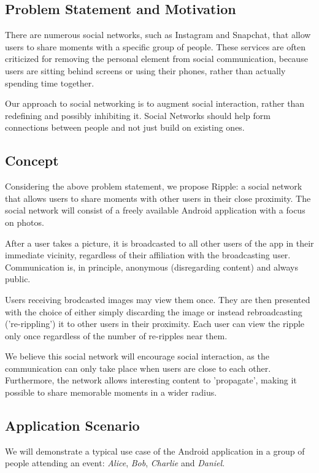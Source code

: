 \documentclass{report}
\begin{document}
\subsection{Problem Statement and Motivation}
There are numerous social networks, such as Instagram and Snapchat, that allow users to share moments with a specific group of people.
These services are often criticized for removing the personal element from social communication, because users are sitting behind screens or using their phones, rather than actually spending time together.

Our approach to social networking is to augment social interaction, rather than redefining and possibly inhibiting it. Social Networks should help form connections between people and not just build on existing ones.

\subsection{Concept}
Considering the above problem statement, we propose Ripple: a social network that allows users to share moments with other users in their close proximity. The social network will consist of a freely available Android application with a focus on photos.

After a user takes a picture, it is broadcasted to all other users of the app in their immediate vicinity, regardless of their affiliation with the broadcasting user. Communication is, in principle, anonymous (disregarding content) and always public.

Users receiving brodcasted images may view them once. They are then presented with the choice of either simply discarding the image or instead rebroadcasting ('re-rippling') it to other users in their proximity.
Each user can view the ripple only once regardless of the number of re-ripples near them.

We believe this social network will encourage social interaction, as the communication can only take place when users are close to each other. Furthermore, the network allows interesting content to 'propagate', making it possible to share memorable moments in a wider radius.

\subsection{Application Scenario}
We will demonstrate a typical use case of the Android application in a group of people attending an event: \textit{Alice}, \textit{Bob}, \textit{Charlie} and \textit{Daniel}.
\end{document}
